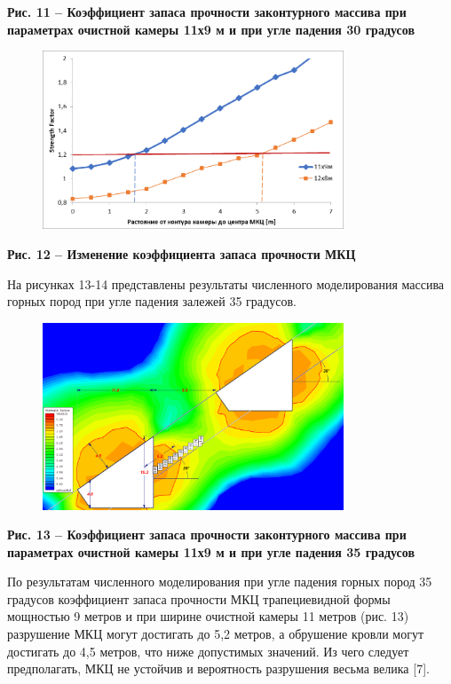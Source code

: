 {\bfseries Рис. 11 -- Коэффициент запаса прочности законтурного массива при
параметрах очистной камеры 11х9 м и при угле падения 30 градусов}

\begin{figure}[H]
	\centering
	\includegraphics[width=0.8\textwidth]{assets/292}
	\caption*{}
\end{figure}

{\bfseries Рис. 12 -- Изменение коэффициента запаса прочности МКЦ}

На рисунках 13-14 представлены результаты численного моделирования
массива горных пород при угле падения залежей 35 градусов.

\begin{figure}[H]
	\centering
	\includegraphics[width=0.8\textwidth]{assets/293}
	\caption*{}
\end{figure}

{\bfseries Рис. 13 -- Коэффициент запаса прочности законтурного массива при
параметрах очистной камеры 11х9 м и при угле падения 35 градусов}

По результатам численного моделирования при угле падения горных пород 35
градусов коэффициент запаса прочности МКЦ трапециевидной формы мощностью
9 метров и при ширине очистной камеры 11 метров (рис. 13) разрушение МКЦ
могут достигать до 5,2 метров, а обрушение кровли могут достигать до 4,5
метров, что ниже допустимых значений. Из чего следует предполагать, МКЦ
не устойчив и вероятность разрушения весьма велика {[}7{]}.

